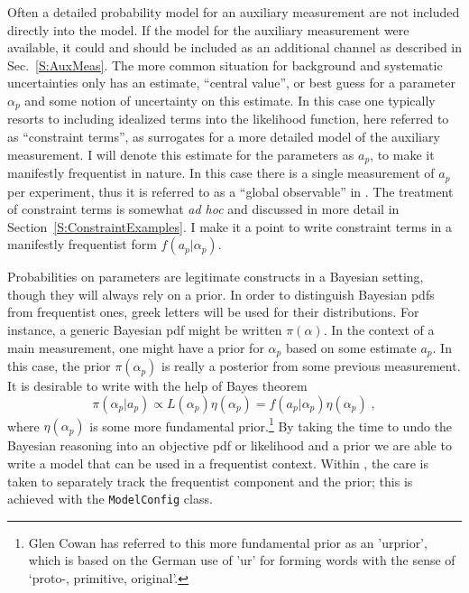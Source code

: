 Often a detailed probability model for an auxiliary measurement are not included directly into the model.  If the model for the auxiliary measurement were available, it could and should be included as an additional channel as described in Sec.~\ref{S:AuxMeas}.  The more common situation for background  and systematic uncertainties only has an estimate,  ``central value'', or best guess for a parameter $\alpha_p$ and some notion of uncertainty on this estimate.  In this case one typically resorts to including idealized terms into the likelihood function, here referred to as ``constraint terms'', as surrogates for a more detailed model of the auxiliary measurement.   I will denote this estimate for the parameters as $a_p$, to make it manifestly frequentist in nature.  In this case there is a single measurement of $a_p$ per experiment, thus it is referred to as a ``global observable'' in \roostats.  The treatment of constraint terms is somewhat \emph{ad hoc} and discussed in more detail in Section~\ref{S:ConstraintExamples}.  I make it a point to write constraint terms in a manifestly frequentist form $f(a_p | \alpha_p)$.  


Probabilities on parameters are legitimate constructs in a Bayesian setting, though they will always rely on a prior.  In order to distinguish Bayesian pdfs from frequentist ones, greek letters will be used for their distributions.  For instance, a generic Bayesian pdf might be written $\pi(\alpha)$.  In the context of a main measurement, one might have a prior for $\alpha_p$ based on some estimate $a_p$.  In this case, the prior $\pi(\alpha_p )$ is really a posterior from some previous measurement.  It is desirable to write with the help of Bayes theorem
\begin{equation}
\label{eq:urprior}
\pi(\alpha_p | a_p) \propto L( \alpha_p ) \eta(\alpha_p) = f(a_p|\alpha_p) \eta(\alpha_p)\; ,
\end{equation}
where $\eta(\alpha_p)$ is some more fundamental prior.\footnote{Glen Cowan has referred to this more fundamental prior as an 'urprior', which is based on the German use of 'ur' for forming words with the sense of `proto-, primitive, original'.}  By taking the time to undo the Bayesian reasoning into an objective pdf or likelihood and a prior we are able to write a model that can be used in a frequentist context.  Within \roostats, the care is taken to separately track the frequentist component and the prior; this is achieved with the \texttt{ModelConfig} class.


